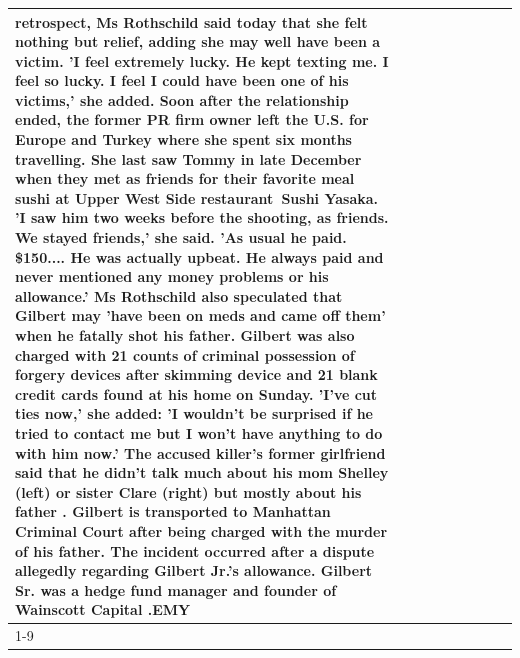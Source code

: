 \begin{table}[H]
\begin{tabular}{lllrlllll}
retrospect, Ms Rothschild said today that she felt nothing but relief, adding she may well have been a victim. 'I feel extremely lucky. He kept texting me. I feel so lucky. I feel I could have been one of his victims,' she added. Soon after the relationship ended, the former PR firm owner left the U.S. for Europe and Turkey where she spent six months  travelling. She last saw Tommy in late December when they met as friends for their favorite meal sushi at Upper West Side restaurant Sushi Yasaka. 'I saw him two weeks before the shooting, as friends. We stayed friends,' she said. 'As usual he paid. \$150.... He was actually upbeat. He always paid and never mentioned any money problems or his allowance.' Ms Rothschild also speculated that Gilbert may 'have been on meds and came off them' when he fatally shot his father. Gilbert was also charged with 21 counts of criminal possession of forgery devices after skimming device and 21 blank credit cards found at his home on Sunday. 'I've cut ties now,' she added: 'I wouldn’t be surprised if he tried to contact me but I won’t have anything to do with him now.' The accused killer's former girlfriend said that he didn't talk much about his mom Shelley (left) or sister Clare (right) but mostly about his father . Gilbert is transported to Manhattan Criminal Court  after being charged with the murder of his father. The incident occurred after a dispute allegedly regarding Gilbert Jr.'s allowance. Gilbert Sr. was a hedge fund manager and founder of Wainscott Capital .EMY \\
\cline{1-9}

\end{tabular}
\end{table}
